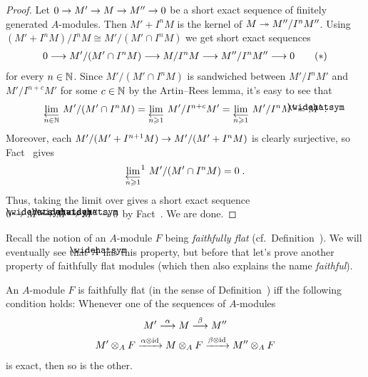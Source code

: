 \documentclass[a4paper,parskip=half,numbers=enddot, DIV=12]{scrreprt}
\renewcommand{\geq}{\geqslant}
\begin{document}
\begin{proof}
	Let $0\morphism M'\morphism M\morphism M''\morphism 0$ be a short exact sequence of finitely generated $A$-modules. Then $M'+I^nM$ is the kernel of $M\epimorphism M''/I^nM''$. Using $(M'+I^nM)/I^nM\cong M'/(M'\cap I^nM)$ we get short exact sequences
	\begin{align}\lbl{eq:completion}
		0\morphism M'/(M'\cap I^nM)\morphism M/I^nM\morphism M''/I^nM''\morphism 0\tag{$*$}
	\end{align}
	for every $n\in\mathbb{N}$. Since $M'/(M'\cap I^nM)$ is sandwiched between $M'/I^nM'$ and $M'/I^{n+c}M'$ for some $c\in\mathbb{N}$ by the Artin--Rees lemma, it's easy to see that 
	\begin{align*}
		\limit[n\in \IN] M'/(M'\cap I^nM)=\limit[n\geq 1]M'/I^{n+c}M'=\limit[n\geq 1]M'/I^nM'=\roof{M}'\;. 
	\end{align*}
	Moreover, each $M'/(M'+I^{n+1}M)\morphism M'/(M'+I^nM)$ is clearly surjective, so Fact~ gives 
	\begin{align*}
		\limit[n\geq 1][^1]M'/(M'\cap I^nM)=0\;.
	\end{align*}
	Thus, taking the limit over  gives a short exact sequence $0\morphism \roof{M}'\morphism \roof{M}\morphism\roof{M}''\morphism 0$ by Fact~. We are done.
\end{proof}
Recall the notion of an $A$-module $F$ being \emph{faithfully flat} (cf.\ Definition~). We will eventually see that $\roof{A}$ has this property, but before that let's prove another property of faithfully flat modules (which then also explains the name \emph{faithful}).
\begin{lem}
	An $A$-module $F$ is faithfully flat (in the sense of Definition~) iff the following condition holds: Whenever one of the sequences of $A$-modules
	\begin{gather*}
		M'\morphism[\alpha]M\morphism[\beta]M''\\
		M'\otimes_AF\xrightarrow{\alpha\otimes\id}M\otimes_AF\xrightarrow{\beta\otimes\id}M''\otimes_AF
	\end{gather*}
	is exact, then so is the other.
\end{lem}
\end{document}
